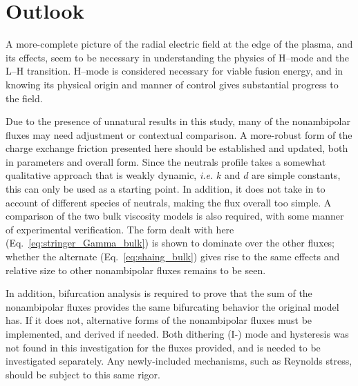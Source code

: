\section{Outlook} \label{sec:outlook}
A more-complete picture of the radial electric field at the edge of the plasma, and its effects, seem to be necessary in understanding the physics of H--mode and the L--H transition.
H--mode is considered necessary for viable fusion energy, and in knowing its physical origin and manner of control gives substantial progress to the field.

Due to the presence of unnatural results in this study, many of the nonambipolar fluxes may need adjustment or contextual comparison.
A more-robust form of the charge exchange friction presented here should be established and updated, both in parameters and overall form.
Since the neutrals profile takes a somewhat qualitative approach that is weakly dynamic, \emph{i.e.} $k$ and $d$ are simple constants, this can only be used as a starting point.
In addition, it does not take in to account of different species of neutrals, making the flux overall too simple.
A comparison of the two bulk viscosity models is also required, with some manner of experimental verification.
The form dealt with here (Eq.~\ref{eq:stringer_Gamma_bulk}) is shown to dominate over the other fluxes; whether the alternate (Eq.~\ref{eq:shaing_bulk}) gives rise to the same effects and relative size to other nonambipolar fluxes remains to be seen.

In addition, bifurcation analysis is required to prove that the sum of the nonambipolar fluxes provides the same bifurcating behavior the original model has.
If it does not, alternative forms of the nonambipolar fluxes must be implemented, and derived if needed.
Both dithering (I-) mode and hysteresis was not found in this investigation for the fluxes provided, and is needed to be investigated separately.
Any newly-included mechanisms, such as Reynolds stress, should be subject to this same rigor.

